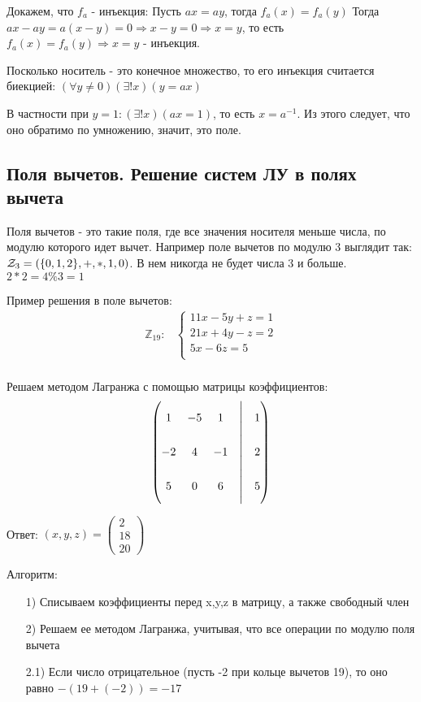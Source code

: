 \documentclass{report}
\begin{document}
Докажем, что $f_a$ - инъекция:\newline
Пусть $ax = ay$, тогда $f_a(x) = f_a(y)$\newline
Тогда $ax - ay = a(x - y) = 0 \Rightarrow x - y = 0 \Rightarrow x = y$, то есть
$f_a(x) = f_a(y) \Rightarrow x = y$ - инъекция.

Посколько носитель - это конечное множество, то его инъекция считается биекцией:
$(\forall y \neq 0)(\exists! x)(y = ax)$

В частности при $y = 1: (\exists! x)(ax = 1)$, то есть $x = a^{-1}$. Из этого
следует, что оно обратимо по умножению, значит, это поле.

\subsection{Поля вычетов. Решение систем ЛУ в полях вычета}
Поля вычетов - это такие поля, где все значения носителя меньше числа, по модулю
которого идет вычет. Например поле вычетов по модулю 3 выглядит так: ${\cal Z}_{3} = (\{0,1,2\}, +, *, 1, 0)$.
В нем никогда не будет числа 3 и больше. $2 * 2 = 4 \% 3 = 1$


Пример решения в поле вычетов:
\begin{align*}
    \mathbb{Z}_{19}: & \begin{cases}
                           11x - 5y +z = 1  \\
                           21x + 4y - z = 2 \\
                           5x - 6z = 5      \\
                       \end{cases} \\
\end{align*}


Решаем методом Лагранжа с помощью матрицы коэффициентов:
$$
    \left(\begin{matrix}
            1  & -5 & 1  & \Biggr{|} & 1 \\
            -2 & 4  & -1 & \Biggr{|} & 2 \\
            5  & 0  & 6  & \Biggr{|} & 5 \\
        \end{matrix}\right)
$$

Ответ: $(x,y,z) = \begin{pmatrix}
        2 \\18\\20
    \end{pmatrix}$

Алгоритм:
\begin{itemize}
    \item[1)] Списываем коэффициенты перед x,y,z в матрицу, а также свободный член
    \item[2)] Решаем ее методом Лагранжа, учитывая, что все операции по модулю поля вычета
    \item[2.1)] Если число отрицательное (пусть -2 при кольце вычетов 19), то оно равно $-(19 + (-2)) = -17$
\end{itemize}
\end{document}
